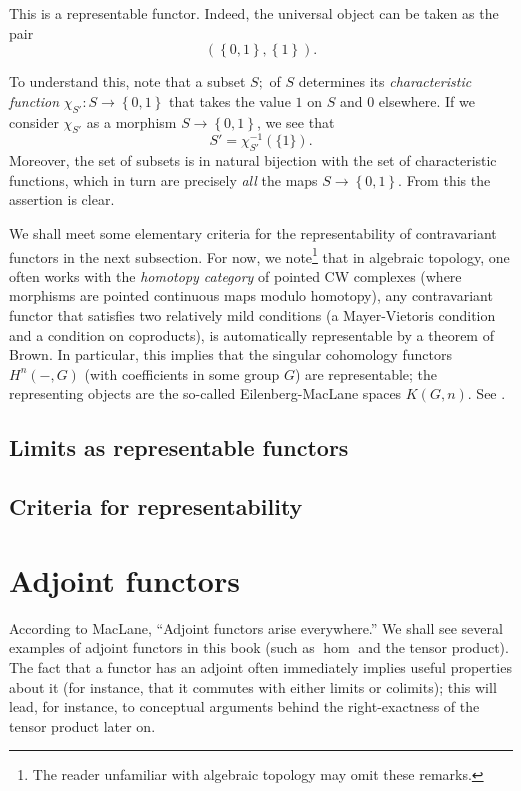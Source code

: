 \begin{proposition}
\begin{example}
This is a representable functor. Indeed, the universal object can be taken as
the pair
\[ ( \left\{0,1\right\}, \left\{1\right\}).  \]

To understand this, note that a subset $S;$ of $S$ determines its
\emph{characteristic function} $\chi_{S'}: S \to \left\{0,1\right\}$ that
takes the value $1$ on $S$ and $0$ elsewhere.
If we consider $\chi_{S'}$ as a morphism $ S \to \left\{0,1\right\}$, we see
that
\[ S' = \chi_{S'}^{-1}(\{1\}).  \]
Moreover, the set of subsets is in natural bijection with the set of
characteristic functions, which in turn are precisely \emph{all} the maps $S
\to \left\{0,1\right\}$. From this the assertion is clear.
\end{example}

We shall meet some elementary criteria for the representability of
contravariant functors in the next subsection. For now, we note\footnote{The
reader unfamiliar with algebraic topology may omit these remarks.} that in
algebraic topology, one often works with the \emph{homotopy category} of
pointed CW complexes (where morphisms are pointed continuous maps modulo
homotopy), any contravariant functor that satisfies two relatively mild
conditions (a
Mayer-Vietoris condition and a condition on coproducts), is automatically
representable by a theorem of Brown. In particular, this implies that the
singular cohomology functors $H^n(-, G)$ (with coefficients in some group $G$)
are representable; the representing objects are the so-called
Eilenberg-MacLane spaces  $K(G,n)$.  See \cite{Ha02}.


\subsection{Limits as representable functors}

\add{}

\subsection{Criteria for representability}

\section{Adjoint functors}

According to MacLane, ``Adjoint functors arise everywhere.'' We shall see
several examples of adjoint functors in this book (such as $\hom$ and the
tensor product). The fact that a functor has an adjoint often immediately
implies useful properties about it (for instance, that it commutes with either
limits or colimits); this will lead, for instance, to conceptual arguments
behind the right-exactness of the tensor product later on.



\end{proposition}
